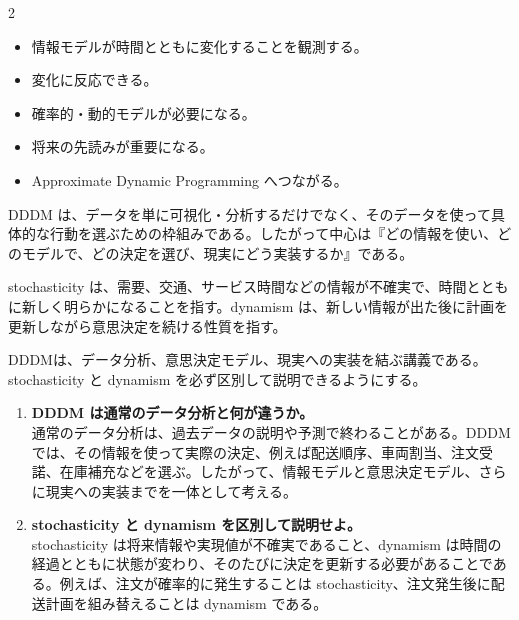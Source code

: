 \begin{multicols}{2}

\footnotesize

\raggedcolumns


\begin{itemize}
\item 情報モデルが時間とともに変化することを観測する。
\item 変化に反応できる。
\item 確率的・動的モデルが必要になる。
\item 将来の先読みが重要になる。
\item Approximate Dynamic Programming へつながる。
\end{itemize}

DDDM は、データを単に可視化・分析するだけでなく、そのデータを使って具体的な行動を選ぶための枠組みである。したがって中心は『どの情報を使い、どのモデルで、どの決定を選び、現実にどう実装するか』である。\par

stochasticity は、需要、交通、サービス時間などの情報が不確実で、時間とともに新しく明らかになることを指す。dynamism は、新しい情報が出た後に計画を更新しながら意思決定を続ける性質を指す。\par

DDDMは、データ分析、意思決定モデル、現実への実装を結ぶ講義である。stochasticity と dynamism を必ず区別して説明できるようにする。\par

\begin{enumerate}
\item \textbf{DDDM は通常のデータ分析と何が違うか。}\\
通常のデータ分析は、過去データの説明や予測で終わることがある。DDDMでは、その情報を使って実際の決定、例えば配送順序、車両割当、注文受諾、在庫補充などを選ぶ。したがって、情報モデルと意思決定モデル、さらに現実への実装までを一体として考える。
\item \textbf{stochasticity と dynamism を区別して説明せよ。}\\
stochasticity は将来情報や実現値が不確実であること、dynamism は時間の経過とともに状態が変わり、そのたびに決定を更新する必要があることである。例えば、注文が確率的に発生することは stochasticity、注文発生後に配送計画を組み替えることは dynamism である。
\end{enumerate}

\end{multicols}

